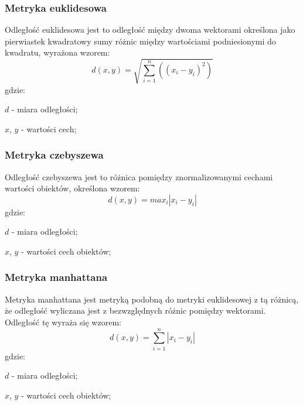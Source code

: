 \documentclass{classrep}
\begin{document}
\subsubsection{Metryka euklidesowa}
Odległość euklidesowa jest to odległość między dwoma wektorami określona jako pierwiastek kwadratowy sumy różnic między
wartościami podniesionymi do kwadratu, wyrażona wzorem:
\begin{equation}
    d(x,y)=\sqrt{\sum_{i=1}^{n}((x_{i}-y_{i})^{2})}
\end{equation}
gdzie:\\
\begin{description}
    \item $d$ - miara odległości;
    \item $x$, $y$ - wartości cech;
\end{description}

\subsubsection{Metryka czebyszewa}
Odległość czebyszewa jest to różnica pomiędzy znormalizowanymi cechami wartości obiektów, określona wzorem:
\begin{equation}
    d(x,y)=max_{i}|x_{i}-y_{i}|
\end{equation}
gdzie:\\
\begin{description}
    \item $d$ - miara odległości;
    \item $x$, $y$ - wartości cech obiektów;
\end{description}

\subsubsection{Metryka manhattana}
Metryka manhattana jest metryką podobną do metryki euklidesowej z tą różnicą, że odległość wyliczana jest
z bezwzględnych różnic pomiędzy wektorami. Odległość tę wyraża się wzorem:
\begin{equation}
    d(x,y)=\sum_{i=1}^{n} |x_{i}-y_{i}|
\end{equation}
gdzie:\\
\begin{description}
    \item $d$ - miara odległości;
    \item $x$, $y$ - wartości cech obiektów;
\end{description}
\end{document}
